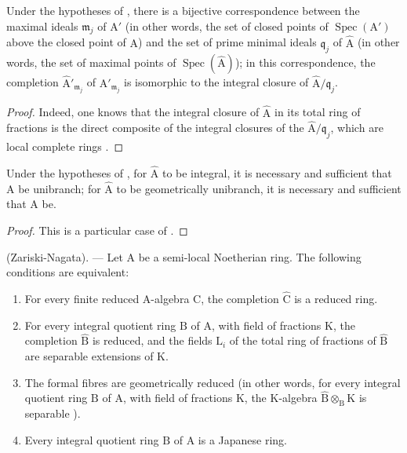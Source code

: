\begin{corollary}[7.6.2]
\label{IV.7.6.2}
Under the hypotheses of , there is a bijective correspondence between the maximal ideals $\mathfrak{m}_j$ of $\mathrm{A}'$ (in other words, the set of closed points of $\operatorname{Spec}(\mathrm{A}')$ above the closed point of $\mathrm{A}$) and the set of prime minimal ideals $\mathfrak{q}_j$ of $\widehat{\mathrm{A}}$ (in other words, the set of maximal points of $\operatorname{Spec}(\widehat{\mathrm{A}})$); in this correspondence, the completion $\widehat{\mathrm{A}}'_{\mathfrak{m}_j}$ of $\mathrm{A}'_{\mathfrak{m}_j}$ is isomorphic to the integral closure of $\widehat{\mathrm{A}}/\mathfrak{q}_j$.
\end{corollary}

\begin{proof}
Indeed, one knows that the integral closure of $\widehat{\mathrm{A}}$ in its total ring of fractions is the direct composite of the integral closures of the $\widehat{\mathrm{A}}/\mathfrak{q}_j$, which are local complete rings .
\end{proof}

\begin{corollary}[7.6.3]
\label{IV.7.6.3}
Under the hypotheses of , for $\widehat{\mathrm{A}}$ to be integral, it is necessary and sufficient that $\mathrm{A}$ be unibranch; for $\widehat{\mathrm{A}}$ to be geometrically unibranch, it is necessary and sufficient that $\mathrm{A}$ be.
\end{corollary}

\begin{proof}
This is a particular case of .
\end{proof}

\begin{theorem}[7.6.4]
\label{IV.7.6.4}
(Zariski-Nagata). --- Let $\mathrm{A}$ be a semi-local Noetherian ring. The following conditions are equivalent:
\begin{enumerate}[label=\emph{\alph*)}]
  \item For every finite reduced $\mathrm{A}$-algebra $\mathrm{C}$, the completion $\widehat{\mathrm{C}}$ is a reduced ring.
  \item[\rm a$'$)] For every integral quotient ring $\mathrm{B}$ of $\mathrm{A}$, with field of fractions $\mathrm{K}$, the completion $\widehat{\mathrm{B}}$ is reduced, and the fields $\mathrm{L}_i$ of the total ring of fractions of $\widehat{\mathrm{B}}$ are separable extensions of $\mathrm{K}$.
  \item[\rm a$''$)] The formal fibres are geometrically reduced (in other words, for every integral quotient ring $\mathrm{B}$ of $\mathrm{A}$, with field of fractions $\mathrm{K}$, the $\mathrm{K}$-algebra $\widehat{\mathrm{B}}\otimes_\mathrm{B}\mathrm{K}$ is separable ).
  \item Every integral quotient ring $\mathrm{B}$ of $\mathrm{A}$ is a Japanese ring.
\end{enumerate}
\end{theorem}

